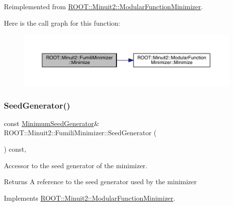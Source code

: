 Reimplemented from \mbox{\hyperlink{classROOT_1_1Minuit2_1_1ModularFunctionMinimizer_ac2b4ce9fa735f5014f610fd0374c58e4}{R\+O\+O\+T\+::\+Minuit2\+::\+Modular\+Function\+Minimizer}}.

Here is the call graph for this function\+:
\nopagebreak
\begin{figure}[H]
\begin{center}
\leavevmode
\includegraphics[width=350pt]{db/da1/classROOT_1_1Minuit2_1_1FumiliMinimizer_ace396e586a17ad934f18b32c8ddd054a_cgraph}
\end{center}
\end{figure}
\mbox{\label{classROOT_1_1Minuit2_1_1FumiliMinimizer_ad8906dbac7f0c20284e361be606d5634}} 
\subsubsection{\texorpdfstring{SeedGenerator()}{SeedGenerator()}\hspace{0.1cm}{\footnotesize\ttfamily [1/2]}}
{\footnotesize\ttfamily const \mbox{\hyperlink{classROOT_1_1Minuit2_1_1MinimumSeedGenerator}{Minimum\+Seed\+Generator}}\& R\+O\+O\+T\+::\+Minuit2\+::\+Fumili\+Minimizer\+::\+Seed\+Generator (\begin{DoxyParamCaption}{ }\end{DoxyParamCaption}) const\hspace{0.3cm}{\ttfamily [inline]}, {\ttfamily [virtual]}}

Accessor to the seed generator of the minimizer.

\begin{DoxyReturn}{Returns}
A reference to the seed generator used by the minimizer 
\end{DoxyReturn}


Implements \mbox{\hyperlink{classROOT_1_1Minuit2_1_1ModularFunctionMinimizer_a742930de97b0ce9ba23773874ae0894b}{R\+O\+O\+T\+::\+Minuit2\+::\+Modular\+Function\+Minimizer}}.


